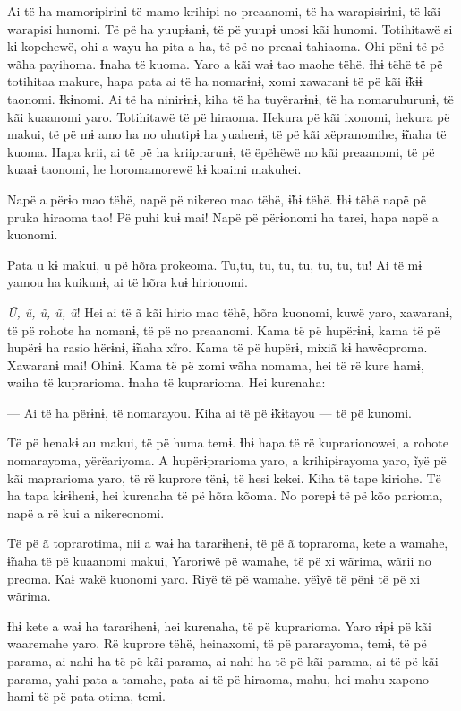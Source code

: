 Ai të ha mamoripɨrɨnɨ të mamo krihipɨ no preaanomi, të ha warapisirɨnɨ,
të kãi warapisi hunomi. Të pë ha yuupɨanɨ, të pë yuupɨ unosi kãi hunomi.
Totihitawë si kɨ kopehewë, ohi a wayu ha pita a ha, të pë no preaaɨ
tahiaoma. Ohi pënɨ të pë wãha payihoma. Ɨnaha të kuoma. Yaro a kãi waɨ
tao maohe tëhë. Ɨhɨ tëhë të pë totihitaa makure, hapa pata ai të ha
nomarɨnɨ, xomi xawaranɨ të pë kãi ɨ̃kɨɨ taonomi. Ɨkɨnomi. Ai të ha
ninirɨnɨ, kiha të ha tuyërarɨnɨ, të ha nomaruhurunɨ, të kãi kuaanomi
yaro. Totihitawë të pë hiraoma. Hekura pë kãi ixonomi, hekura pë makui,
të pë mɨ amo ha no uhutipɨ ha yuahenɨ, të pë kãi xëpranomihe, ɨ̃naha të
kuoma. Hapa krii, ai të pë ha kriiprarunɨ, të ëpëhëwë no kãi preaanomi,
të pë kuaaɨ taonomi, he horomamorewë kɨ koaimi makuhei. 

Napë a përɨo mao tëhë, napë pë nikereo mao tëhë, ɨ̃hɨ tëhë. Ɨhɨ tëhë napë
pë pruka hiraoma tao! Pë puhi kuɨ mai! Napë pë përɨonomi ha tarei, hapa
napë a kuonomi. 

Pata u kɨ makui, u pë hõra prokeoma. Tu,tu, tu, tu, tu, tu, tu, tu! Ai
të mɨ yamou ha kuikunɨ, ai të hõra kuɨ hirionomi. 

\textit{Ũ, ũ, ũ, ũ, ũ}! Hei ai të ã kãi hirio mao tëhë, hõra kuonomi, kuwë
yaro, xawaranɨ, të pë rohote ha nomanɨ, të pë no preaanomi. Kama të pë
hupërɨnɨ, kama të pë hupërɨ ha rasio hërɨnɨ, ɨ̃naha xĩro. Kama të pë
hupërɨ, mixiã kɨ hawëoproma. Xawaranɨ mai! Ohinɨ. Kama të pë xomi wãha
nomama, hei të rë kure hamɨ, waiha të kuprarioma. Ɨnaha të kuprarioma.
Hei kurenaha: 

--- Ai të ha përɨnɨ, të nomarayou. Kiha ai të pë ɨ̃kɨtayou --- të pë
kunomi. 

Të pë henakɨ au makui, të pë huma temɨ. Ɨhɨ hapa të rë kuprarionowei, a
rohote nomarayoma, yërëariyoma. A hupërɨprarioma yaro, a krihipɨrayoma
yaro, ĩyë pë kãi maprarioma yaro, të rë kuprore tënɨ, të hesi kekei.
Kiha të tape kiriohe. Të ha tapa kɨrɨhenɨ, hei kurenaha të pë hõra
kõoma. No porepɨ të pë kõo parɨoma, napë a rë kui a nikereonomi. 

Të pë ã toprarotima, nii a waɨ ha tararɨhenɨ, të pë ã topraroma, kete a
wamahe, ɨ̃naha të pë kuaanomi makui, Yaroriwë pë wamahe, të pë xi wãrima,
wãrii no preoma. Kaɨ wakë kuonomi yaro. Riyë të pë wamahe. yëĩyë të pënɨ
të pë xi wãrima. 

Ɨhɨ kete a waɨ ha tararɨhenɨ, hei kurenaha, të pë kuprarioma. Yaro rɨpɨ
pë kãi waaremahe yaro. Rë kuprore tëhë, heinaxomi, të pë pararayoma,
temɨ, të pë parama, ai nahi ha të pë kãi parama, ai nahi ha të pë kãi
parama, ai të pë kãi parama, yahi pata a tamahe, pata ai të pë hiraoma,
mahu, hei mahu xapono hamɨ të pë pata otima, temɨ.

